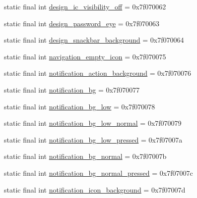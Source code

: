 \begin{DoxyCompactItemize}
\item 
static final int \mbox{\hyperlink{classandroid_1_1support_1_1design_1_1_r_1_1drawable_a131e16776a80b5ad521533f34a9a7a19}{design\+\_\+ic\+\_\+visibility\+\_\+off}} = 0x7f070062
\item 
static final int \mbox{\hyperlink{classandroid_1_1support_1_1design_1_1_r_1_1drawable_a43243cac50e3a6a26b7d8c777d1f821f}{design\+\_\+password\+\_\+eye}} = 0x7f070063
\item 
static final int \mbox{\hyperlink{classandroid_1_1support_1_1design_1_1_r_1_1drawable_a814061df3be11306bb3c0cddedfbcf5f}{design\+\_\+snackbar\+\_\+background}} = 0x7f070064
\item 
static final int \mbox{\hyperlink{classandroid_1_1support_1_1design_1_1_r_1_1drawable_a6f048ef7024f80d105eda85246d749f7}{navigation\+\_\+empty\+\_\+icon}} = 0x7f070075
\item 
static final int \mbox{\hyperlink{classandroid_1_1support_1_1design_1_1_r_1_1drawable_a61f589fa0fd573df67b2eb0d8e6c6655}{notification\+\_\+action\+\_\+background}} = 0x7f070076
\item 
static final int \mbox{\hyperlink{classandroid_1_1support_1_1design_1_1_r_1_1drawable_a0c2d9cb674ac7daf1163a496d9b96c61}{notification\+\_\+bg}} = 0x7f070077
\item 
static final int \mbox{\hyperlink{classandroid_1_1support_1_1design_1_1_r_1_1drawable_afda479b62093e1d3f15c2acf374ab4ca}{notification\+\_\+bg\+\_\+low}} = 0x7f070078
\item 
static final int \mbox{\hyperlink{classandroid_1_1support_1_1design_1_1_r_1_1drawable_a7c9ae1f5f999c9d50ef1cffb3376eac8}{notification\+\_\+bg\+\_\+low\+\_\+normal}} = 0x7f070079
\item 
static final int \mbox{\hyperlink{classandroid_1_1support_1_1design_1_1_r_1_1drawable_a998d0007d33ed671c2a54687b465bb74}{notification\+\_\+bg\+\_\+low\+\_\+pressed}} = 0x7f07007a
\item 
static final int \mbox{\hyperlink{classandroid_1_1support_1_1design_1_1_r_1_1drawable_a082976ea2611d5e4b06b6bd5bbe33a80}{notification\+\_\+bg\+\_\+normal}} = 0x7f07007b
\item 
static final int \mbox{\hyperlink{classandroid_1_1support_1_1design_1_1_r_1_1drawable_a2b66e6494bd4d535188d64efe5f0d250}{notification\+\_\+bg\+\_\+normal\+\_\+pressed}} = 0x7f07007c
\item 
static final int \mbox{\hyperlink{classandroid_1_1support_1_1design_1_1_r_1_1drawable_a1d77f438c8bcf02cda09af18290aabe5}{notification\+\_\+icon\+\_\+background}} = 0x7f07007d

\end{DoxyCompactItemize}
